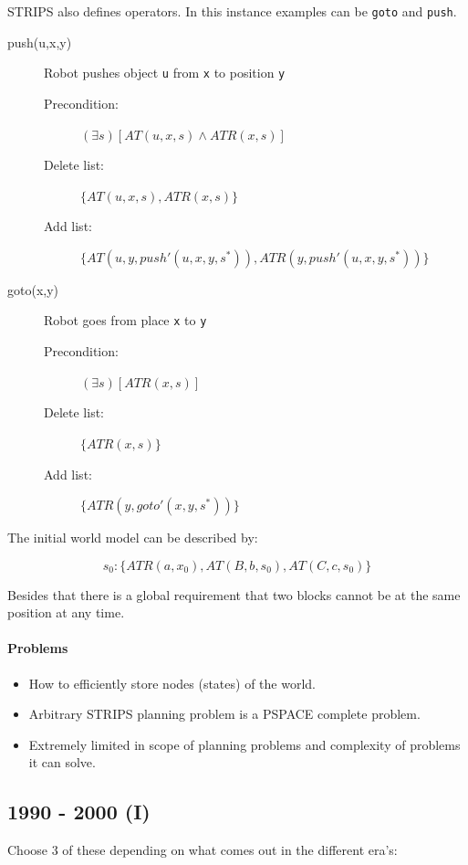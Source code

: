 \documentclass[runningheads,a4paper]{llncs}
\begin{document}
STRIPS also defines operators. In this instance examples can be \texttt{goto}
and \texttt{push}.

\begin{description}
	\item[push(u,x,y)] Robot pushes object \texttt{u} from \texttt{x} to
		position \texttt{y}
	\begin{description}
		\item[Precondition:] $(\exists s) [AT(u,x,s) \land ATR(x,s)]$
		\item[Delete list:] $\{AT(u,x,s), ATR(x,s)\}$
		\item[Add list:] $\{AT(u,y,push'(u,x,y,s^*)), ATR(y,push'(u,x,y,s^*))\}$
	\end{description}
	\item[goto(x,y)] Robot goes from place \texttt{x} to \texttt{y}
	\begin{description}
		\item[Precondition:] $(\exists s) [ATR(x,s)]$
		\item[Delete list:] $\{ATR(x,s)\}$
		\item[Add list:] $\{ATR(y,goto'(x,y,s^*))\}$
	\end{description}
\end{description}

The initial world model can be described by:

\[
	s_0 : \{ ATR(a,x_0), AT(B,b,s_0), AT(C,c,s_0) \}
\]

Besides that there is a global requirement that two blocks cannot be at the
same position at any time.

\paragraph{Problems}

\begin{itemize}
	\item How to efficiently store nodes (states) of the
		world.~\cite{fikes1971strips}
	\item Arbitrary STRIPS planning problem is a PSPACE complete
		problem.~\cite{mcallester1991systematic}
	\item Extremely limited in scope of planning problems and complexity of
		problems it can solve.~\cite{fikes1994strips}
\end{itemize}

\subsection{1990 - 2000 (I)}
Choose 3 of these depending on what comes out in the different era's:
\end{document}
